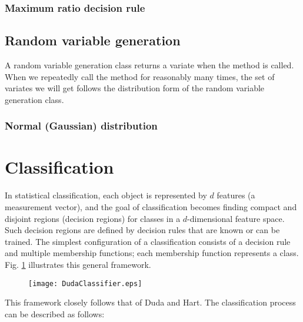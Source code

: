 

\subsubsection{Maximum ratio decision rule}
\label{sec:MaximumRatioDecisionRule}



\subsection{Random variable generation}
\label{sec:RandomVariableGeneration}

A random variable generation class returns a variate when the
 method is called. When we repeatedly call the method
for reasonably many times, the set of variates we will get follows
the distribution form of the random variable generation class.
 
\subsubsection{Normal (Gaussian) distribution}
\label{sec:NormalVariateGeneration}



\section{Classification}
\label{sec:Classification}

In statistical classification, each object is represented by $d$
features (a measurement vector), and the goal of classification
becomes finding compact and disjoint regions (decision
regions\cite{Duda2000}) for classes in a $d$-dimensional feature
space. Such decision regions are defined by
decision rules that are known or can be trained.  The simplest
configuration of a classification consists of a decision rule and
multiple membership functions; each membership function represents a
class. Fig. \ref{fig:simple} illustrates this general framework.

\begin{figure}[h]
  \centering
  \texttt{[image: DudaClassifier.eps]}
  \label{fig:simple}
\end{figure}

This framework closely follows that of Duda and
Hart\cite{Duda2000}. The classification process can be described
as follows:

